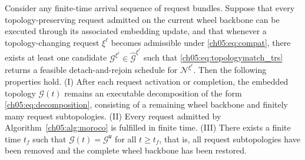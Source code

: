 \begin{theorem}
\label{ch05:thm:moroco-complete-short}
Consider any finite-time arrival sequence of request bundles.
Suppose that every topology-preserving request admitted on the current
wheel backbone can be executed through its associated embedding update,
and that whenever a topology-changing request \(\xi^{\ell}\) becomes
admissible under \eqref{ch05:eq:compat}, there exists at least one
candidate \(\mathcal{G}^{\xi^{\ell}}\in
\widehat{\mathcal{G}}^{\xi^{\ell}}\) such that
\eqref{ch05:eq:topologymatch_trs} returns a feasible detach-and-rejoin
schedule for \(\mathcal{N}^{\xi^{\ell}}\). Then the following
properties hold.
(I) After each request activation or completion, the embedded topology
\(\mathcal{G}(t)\) remains an executable decomposition of the form
\eqref{ch05:eq:decomposition}, consisting of a remaining wheel
backbone and finitely many request subtopologies.
(II) Every request admitted by Algorithm~\ref{ch05:alg:moroco} is fulfilled
in finite time.
(III) There exists a finite time \(t_f\) such that
\(\mathcal{G}(t)=\mathcal{G}^{\texttt{w}}\) for all \(t\ge t_f\),
that is, all request subtopologies have been removed and the complete
wheel backbone has been restored.
\end{theorem}

